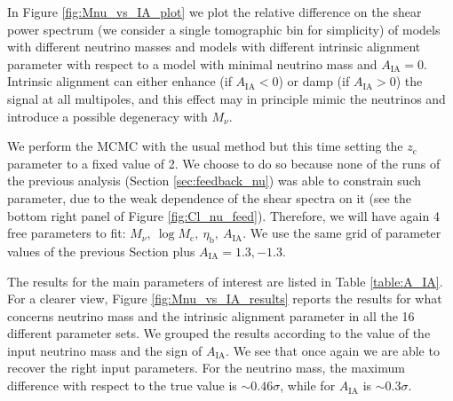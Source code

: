 \documentclass[a4paper,11pt]{article}
\begin{document}
In Figure \ref{fig:Mnu_vs_IA_plot} we plot the relative difference on the shear power spectrum (we consider a single tomographic bin for simplicity) of models with different neutrino masses and models with different intrinsic alignment parameter with respect to a model with minimal neutrino mass and $A_\mathrm{IA} = 0$.
Intrinsic alignment can either enhance (if $A_\mathrm{IA}<0$) or damp (if $A_\mathrm{IA}>0$) the signal at all multipoles, and this effect may in principle mimic the neutrinos and introduce a possible degeneracy with $M_\nu$.  

We perform the MCMC with the usual method but this time setting the $z_\mathrm c$ parameter to a fixed value of 2.
We choose to do so because none of the runs of the previous analysis (Section \ref{sec:feedback_nu}) was able to constrain such parameter, due to the weak dependence of the shear spectra on it (see the bottom right panel of Figure \ref{fig:Cl_nu_feed}).
Therefore, we will have again 4 free parameters to fit: $M_\nu, \ \log M_\mathrm c, \ \eta_\mathrm b, \ A_\mathrm{IA}$.
We use the same grid of parameter values of the previous Section plus $A_\mathrm{IA} = 1.3, -1.3$.

The results for the main parameters of interest are listed in Table \ref{table:A_IA}.
For a clearer view, Figure \ref{fig:Mnu_vs_IA_results} reports the results for what concerns neutrino mass and the intrinsic alignment parameter in all the 16 different parameter sets.
We grouped the results according to the value of the input neutrino mass and the sign of $A_\mathrm{IA}$.
We see that once again we are able to recover the right input parameters.
For the neutrino mass, the maximum difference with respect to the true value is $\sim 0.46\sigma$, while for $A_\mathrm{IA}$ is $\sim 0.3\sigma$.
\end{document}
